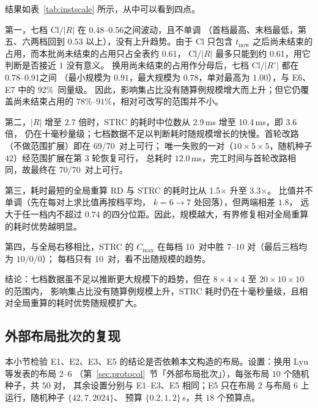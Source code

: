 \documentclass[manuscript,screen,review]{acmart}
\providecommand{\STRC}{\textsc{STRC}}
\newcommand{\NSeeds}{10}
\newcommand{\ClosureAliveFrac}{92\%}
\newcommand{\NPubPairs}{50}
\newcommand{\ScalePairs}{70}
\newcommand{\ScaleJobsHi}{20}
\newcommand{\ScaleMachHi}{10}
\newcommand{\ScaleCloLo}{0.48}       %
\newcommand{\ScaleCloHi}{0.56}       %
\newcommand{\ScaleAliveShare}{0.61}  %
\newcommand{\ScaleCloAliveLo}{0.78}  %
\newcommand{\ScaleCloAliveHi}{0.91}  %
\newcommand{\ScaleMsHi}{10.4}        %
\newcommand{\ScaleRatioLo}{1.5}      %
\newcommand{\ScaleRatioHi}{3.3}      %
\newcommand{\ScaleFeasFirst}{69/\ScalePairs}   %
\newcommand{\ScaleFeasAll}{\ScalePairs/\ScalePairs}
\begin{document}
结果如表~\ref{tab:instscale} 所示，从中可以看到四点。

第一，七档 \(\mathrm{Cl}/|R|\) 在 \ScaleCloLo--\ScaleCloHi 之间波动，且不单调
（首档最高、末档最低，第五、六两档回到 \(0.53\) 以上），没有上升趋势。由于 \(\mathrm{Cl}\) 只包含
\(t_{\mathrm{now}}\) 之后尚未结束的占用，而本批尚未结束的占用只占全表约 \ScaleAliveShare，
\(\mathrm{Cl}/|R|\) 最多只能到约 \ScaleAliveShare，用它判断是否接近 \(1\) 没有意义。
换用尚未结束的占用作分母后，七档 \(\mathrm{Cl}/|R^{\circ}|\) 都在 \ScaleCloAliveLo--\ScaleCloAliveHi 之间
（最小规模为 \(0.91\)，最大规模为 \(0.78\)，单对最高为 \(1.00\)），与 E6、E7 中的 \ClosureAliveFrac\ 同量级。
因此，影响集占比没有随算例规模增大而上升；但它仍覆盖尚未结束占用的 \(78\%\)--\(91\%\)，相对可改写的范围并不小。

第二，\(|R|\) 增至 \(2.7\) 倍时，\STRC{} 的耗时中位数从 \(2.9\)\,ms 增至 \ScaleMsHi\,ms，即 \(3.6\) 倍，
仍在十毫秒量级；七档数据不足以判断耗时随规模增长的快慢。首轮改路（不做范围扩展）即在 \ScaleFeasFirst\ 对上可行；
唯一失败的一对（\(10\times5\times5\)，随机种子 \(42\)）经范围扩展在第 \(3\) 轮恢复可行，
总耗时 \(12.0\)\,ms，完工时间与首轮改路相同，故最终在 \ScaleFeasAll\ 对上可行。

第三，耗时最短的全局重算 RD 与 \STRC{} 的耗时比从 \ScaleRatioLo\(\times\) 升至 \ScaleRatioHi\(\times\)。
比值并不单调（先在每对上求比值再按档平均， \(k=6\to 7\) 处回落），但两端相差 \(1.8\)，
远大于任一档内不超过 \(0.74\) 的四分位距。因此，规模越大，有界修复相对全局重算的耗时优势越明显。

第四，与全局右移相比，\STRC{} 的 \(C_{\max}\) 在每档 \NSeeds\ 对中胜 \(7\)--\(10\) 对（最后三档均为 \(10/0/0\)）；
每档只有 \NSeeds\ 对，看不出随规模的趋势。

结论：七档数据虽不足以推断更大规模下的趋势，但在 \(8\times4\times4\) 至 \(\ScaleJobsHi\times\ScaleMachHi\times\ScaleMachHi\) 的范围内，
影响集占比没有随算例规模上升，\STRC{} 耗时仍在十毫秒量级，且相对全局重算的耗时优势随规模扩大。

\subsection{外部布局批次的复现}
\label{sec:pubrepro}

本小节检验 E1、E2、E3、E5 的结论是否依赖本文构造的布局。设置：换用 Lyu 等发表的布局 2--6
（第~\ref{sec:protocol}~节「外部布局批次」），每张布局 \(\NSeeds\) 个随机种子，共 \(\NPubPairs\) 对，
其余设置分别与 E1--E3、E5 相同；E5 只在布局 2 与布局 6 上运行，随机种子 \(\{42,7,2024\}\)、
预算 \(\{0.2,1,2\}\)\,s，共 \(18\) 个预算点。
\end{document}
